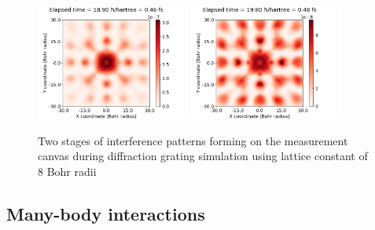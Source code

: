 \begin{figure}[hbtp!]
	\begin{center}
		\includegraphics[width=0.45\textwidth]{figures/optical_grid_interference_01_8_grid.png}
		\includegraphics[width=0.45\textwidth]{figures/optical_grid_interference_02_8_grid.png}
		\caption{Two stages of interference patterns forming on the measurement canvas during diffraction grating simulation using lattice constant of $8$ Bohr radii}
		\label{fig:optical_grid_interference_8_grid}
	\end{center}	
\end{figure}

\FloatBarrier
\subsection{Many-body interactions}

